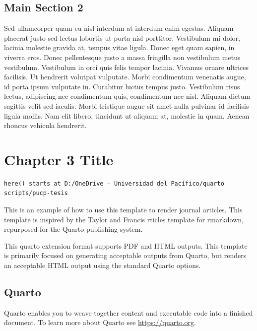 \documentclass[
  letterpaper,
  12pt,
  oneside,
  spanish,
  doublespacing,
  headsepline,
  parskip]{MastersDoctoralThesis}
\begin{document}
\hypertarget{main-section-2}{%
\section{Main Section 2}\label{main-section-2}}

Sed ullamcorper quam eu nisl interdum at interdum enim egestas. Aliquam
placerat justo sed lectus lobortis ut porta nisl porttitor. Vestibulum
mi dolor, lacinia molestie gravida at, tempus vitae ligula. Donec eget
quam sapien, in viverra eros. Donec pellentesque justo a massa fringilla
non vestibulum metus vestibulum. Vestibulum in orci quis felis tempor
lacinia. Vivamus ornare ultrices facilisis. Ut hendrerit volutpat
vulputate. Morbi condimentum venenatis augue, id porta ipsum vulputate
in. Curabitur luctus tempus justo. Vestibulum risus lectus, adipiscing
nec condimentum quis, condimentum nec nisl. Aliquam dictum sagittis
velit sed iaculis. Morbi tristique augue sit amet nulla pulvinar id
facilisis ligula mollis. Nam elit libero, tincidunt ut aliquam at,
molestie in quam. Aenean rhoncus vehicula hendrerit.


\hypertarget{sec-Chapter3}{%
\chapter{Chapter 3 Title}\label{sec-Chapter3}}

\begin{verbatim}
here() starts at D:/OneDrive - Universidad del Pacífico/quarto scripts/pucp-tesis
\end{verbatim}

This is an example of how to use this template to render journal
articles. This template is inspired by the Taylor and Francis rticles
template for rmarkdown, repurposed for the Quarto publishing system.

This quarto extension format supports PDF and HTML outputs. This
template is primarily focused on generating acceptable outputs from
Quarto, but renders an acceptable HTML output using the standard Quarto
options.

\hypertarget{quarto}{%
\section{Quarto}\label{quarto}}

Quarto enables you to weave together content and executable code into a
finished document. To learn more about Quarto see
\url{https://quarto.org}.
\end{document}
